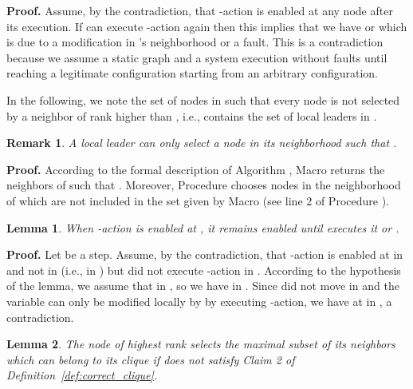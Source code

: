 \documentclass[11pt,letterpaper,onecolumn]{article}
\newtheorem{lemma}{Lemma}
\newenvironment{proof}{\noindent \begin{rm}{\textbf{Proof.} }}{\hspace*{\fill}\par\end{rm} \vspace{.3cm}}
\newtheorem{rem}{Remark}
\begin{document}
\begin{proof}
Assume, by the contradiction, that -action is enabled at any node  after its execution. If  can execute -action again then this implies that we have  or  which is due to a modification in 's neighborhood or a fault. This is a contradiction because we assume a static graph  and a system execution without faults until reaching a legitimate configuration starting from an arbitrary configuration. 
\end{proof}

In the following, we note  the set of nodes in  such that every node  is not selected by a neighbor of rank higher than , i.e.,  contains the set of local leaders in .

\begin{rem}
\label{rem:nodes_rank_clique}
A local leader  can only select a node  in its neighborhood such that .
\end{rem}

\begin{proof}
According to the formal description of Algorithm , Macro  returns the neighbors  of  such that . Moreover, Procedure  chooses nodes in the neighborhood of  which are not included in the set given by Macro  (see line 2 of Procedure ).
\end{proof}

\begin{lemma}
\label{lem:C1-action}
When -action is enabled at , it remains enabled until  executes it or .
\end{lemma}

\begin{proof}
Let  be a step. Assume, by the contradiction, that -action is enabled at  in  and not in  (i.e.,  in ) but  did not execute -action in . According to the hypothesis of the lemma, we assume that  in , so we have  in . Since  did not move in  and the variable  can only be modified locally by  by executing -action, we have  at  in , a contradiction.
\end{proof}

\begin{lemma}
\label{lem:select_clique}
The node  of highest rank selects the maximal subset of its neighbors which can belong to its clique  if  does not satisfy Claim 2 of Definition~\ref{def:correct_clique}.
\end{lemma}
\end{document}
